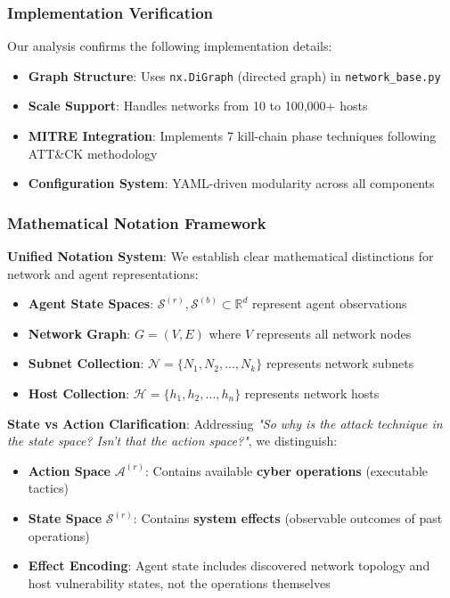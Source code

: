 \documentclass[12pt,twoside]{article}
\newcounter{phase}[algorithm]
\theoremstyle{definition}
\theoremstyle{plain}
\begin{document}
\subsubsection{Implementation Verification}
Our analysis confirms the following implementation details:
\begin{itemize}
    \item \textbf{Graph Structure}: Uses \texttt{nx.DiGraph} (directed graph) in \texttt{network\_base.py}
    \item \textbf{Scale Support}: Handles networks from 10 to 100,000+ hosts
    \item \textbf{MITRE Integration}: Implements 7 kill-chain phase techniques following ATT\&CK methodology
    \item \textbf{Configuration System}: YAML-driven modularity across all components
\end{itemize}

\subsubsection{Mathematical Notation Framework}

\textbf{Unified Notation System}: We establish clear mathematical distinctions for network and agent representations:

\begin{itemize}
\item \textbf{Agent State Spaces}: $\mathcal{S}^{(r)}, \mathcal{S}^{(b)} \subset \mathbb{R}^{d}$ represent agent observations
\item \textbf{Network Graph}: $G = (V, E)$ where $V$ represents all network nodes  
\item \textbf{Subnet Collection}: $\mathcal{N} = \{N_1, N_2, \ldots, N_k\}$ represents network subnets
\item \textbf{Host Collection}: $\mathcal{H} = \{h_1, h_2, \ldots, h_n\}$ represents network hosts
\end{itemize}

\textbf{State vs Action Clarification}: Addressing \textit{"So why is the attack technique in the state space? Isn't that the action space?"}, we distinguish:
\begin{itemize}
\item \textbf{Action Space} $\mathcal{A}^{(r)}$: Contains available \textbf{cyber operations} (executable tactics)
\item \textbf{State Space} $\mathcal{S}^{(r)}$: Contains \textbf{system effects} (observable outcomes of past operations)  
\item \textbf{Effect Encoding}: Agent state includes discovered network topology and host vulnerability states, not the operations themselves
\end{itemize}
\end{document}
